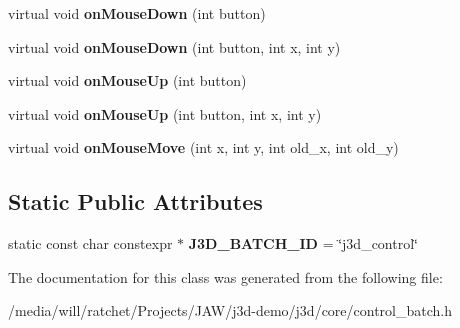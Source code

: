 \begin{DoxyCompactItemize}
\item 
\hypertarget{classj3d_1_1core_1_1ControlBatch_a8bd9107b6342c4a242df74b54b63fe94}{}virtual void {\bfseries on\+Mouse\+Down} (int button)\label{classj3d_1_1core_1_1ControlBatch_a8bd9107b6342c4a242df74b54b63fe94}

\item 
\hypertarget{classj3d_1_1core_1_1ControlBatch_a0e41ceda73ba5c3fb64c7b53bafbe0ca}{}virtual void {\bfseries on\+Mouse\+Down} (int button, int x, int y)\label{classj3d_1_1core_1_1ControlBatch_a0e41ceda73ba5c3fb64c7b53bafbe0ca}

\item 
\hypertarget{classj3d_1_1core_1_1ControlBatch_a2549bd9078646035cd5039318165c778}{}virtual void {\bfseries on\+Mouse\+Up} (int button)\label{classj3d_1_1core_1_1ControlBatch_a2549bd9078646035cd5039318165c778}

\item 
\hypertarget{classj3d_1_1core_1_1ControlBatch_aa29fdf4e8ab857895888f09df55546df}{}virtual void {\bfseries on\+Mouse\+Up} (int button, int x, int y)\label{classj3d_1_1core_1_1ControlBatch_aa29fdf4e8ab857895888f09df55546df}

\item 
\hypertarget{classj3d_1_1core_1_1ControlBatch_a16c72c07ca11e4278ae19165db3ee491}{}virtual void {\bfseries on\+Mouse\+Move} (int x, int y, int old\+\_\+x, int old\+\_\+y)\label{classj3d_1_1core_1_1ControlBatch_a16c72c07ca11e4278ae19165db3ee491}

\end{DoxyCompactItemize}
\subsection*{Static Public Attributes}
\begin{DoxyCompactItemize}
\item 
\hypertarget{classj3d_1_1core_1_1ControlBatch_a192511d7e9b7aca1d655c1bbb78d02bf}{}static const char constexpr $\ast$ {\bfseries J3\+D\+\_\+\+B\+A\+T\+C\+H\+\_\+\+I\+D} = \char`\"{}j3d\+\_\+control\char`\"{}\label{classj3d_1_1core_1_1ControlBatch_a192511d7e9b7aca1d655c1bbb78d02bf}

\end{DoxyCompactItemize}


The documentation for this class was generated from the following file\+:\begin{DoxyCompactItemize}
\item 
/media/will/ratchet/\+Projects/\+J\+A\+W/j3d-\/demo/j3d/core/control\+\_\+batch.\+h\end{DoxyCompactItemize}
